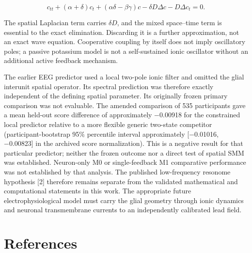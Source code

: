 \documentclass[
  11pt,
]{article}
\begin{document}
\[c_{tt}+(\alpha+\delta)c_t+(\alpha\delta-\beta\gamma)c-\delta D\Delta c-D\Delta c_t=0.\]

The spatial Laplacian term carries \(\delta D\), and the mixed
space--time term is essential to the exact elimination. Discarding it is
a further approximation, not an exact wave equation. Cooperative
coupling by itself does not imply oscillatory poles; a passive potassium
model is not a self-sustained ionic oscillator without an additional
active feedback mechanism.

The earlier EEG predictor used a local two-pole ionic filter and omitted
the glial interunit spatial operator. Its spectral prediction was
therefore exactly independent of the defining spatial parameter. Its
originally frozen primary comparison was not evaluable. The amended
comparison of 535 participants gave a mean held-out score difference of
approximately −0.00918 for the constrained local predictor relative to a
more flexible generic two-state competitor (participant-bootstrap 95\%
percentile interval approximately {[}−0.01016, −0.00823{]} in the
archived score normalization). This is a negative result for that
particular predictor; neither the frozen outcome nor a direct test of
spatial SMM was established. Neuron-only M0 or single-feedback M1
comparative performance was not established by that analysis. The
published low-frequency resonome hypothesis {[}2{]} therefore remains
separate from the validated mathematical and computational statements in
this work. The appropriate future electrophysiological model must carry
the glial geometry through ionic dynamics and neuronal transmembrane
currents to an independently calibrated lead field.

\section*{References}\label{references}
\end{document}
